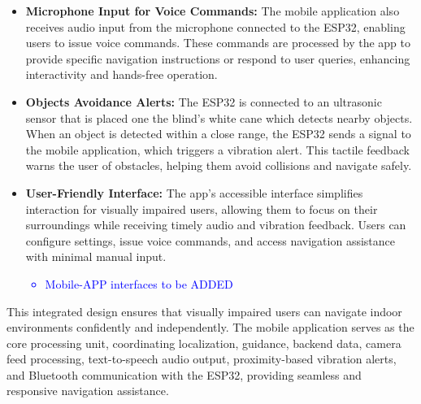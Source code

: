 \begin{itemize}
	\item \textbf{Microphone Input for Voice Commands:} The mobile application also receives audio input from the microphone connected to the ESP32, enabling users to issue voice commands. These commands are processed by the app to provide specific navigation instructions or respond to user queries, enhancing interactivity and hands-free operation.
	
	\item \textbf{Objects Avoidance Alerts:} The ESP32 is connected to an ultrasonic sensor that is placed one the blind's white cane which detects nearby objects. When an object is detected within a close range, the ESP32 sends a signal to the mobile application, which triggers a vibration alert. This tactile feedback warns the user of obstacles, helping them avoid collisions and navigate safely.
	
	\item \textbf{User-Friendly Interface:} The app’s accessible interface simplifies interaction for visually impaired users, allowing them to focus on their surroundings while receiving timely audio and vibration feedback. Users can configure settings, issue voice commands, and access navigation assistance with minimal manual input.
	
	\textcolor{blue}{
		\begin{itemize}
			\item Mobile-APP interfaces to be ADDED
	\end{itemize}}
\end{itemize}

This integrated design ensures that visually impaired users can navigate indoor environments confidently and independently. The mobile application serves as the core processing unit, coordinating localization, guidance, backend data, camera feed processing, text-to-speech audio output, proximity-based vibration alerts, and Bluetooth communication with the ESP32, providing seamless and responsive navigation assistance.
